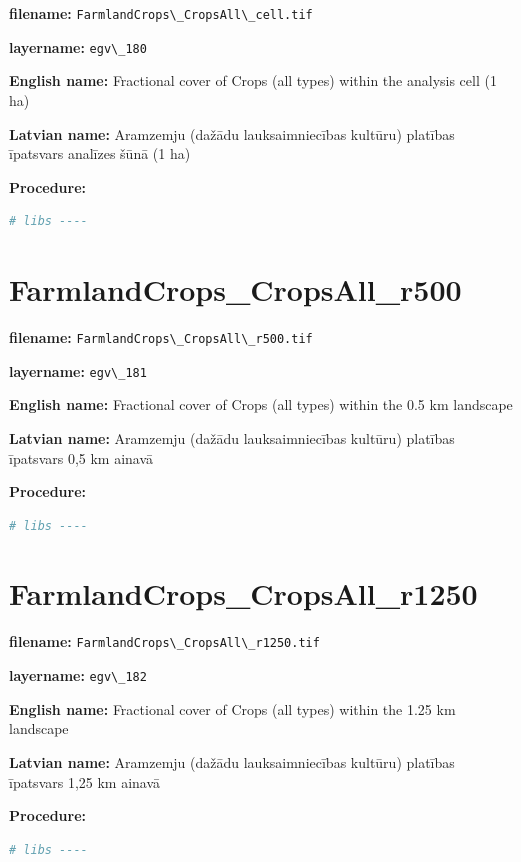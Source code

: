 \documentclass[
]{book}
\newcommand{\passthrough}[1]{#1}
\begin{document}
\textbf{filename:} \passthrough{\lstinline!FarmlandCrops\_CropsAll\_cell.tif!}

\textbf{layername:} \passthrough{\lstinline!egv\_180!}

\textbf{English name:} Fractional cover of Crops (all types) within the analysis cell (1 ha)

\textbf{Latvian name:} Aramzemju (dažādu lauksaimniecības kultūru) platības īpatsvars analīzes šūnā (1 ha)

\textbf{Procedure:}

\begin{lstlisting}[language=R]
# libs ----
\end{lstlisting}

\section{FarmlandCrops\_CropsAll\_r500}\label{ch06.181}

\textbf{filename:} \passthrough{\lstinline!FarmlandCrops\_CropsAll\_r500.tif!}

\textbf{layername:} \passthrough{\lstinline!egv\_181!}

\textbf{English name:} Fractional cover of Crops (all types) within the 0.5 km landscape

\textbf{Latvian name:} Aramzemju (dažādu lauksaimniecības kultūru) platības īpatsvars 0,5 km ainavā

\textbf{Procedure:}

\begin{lstlisting}[language=R]
# libs ----
\end{lstlisting}

\section{FarmlandCrops\_CropsAll\_r1250}\label{ch06.182}

\textbf{filename:} \passthrough{\lstinline!FarmlandCrops\_CropsAll\_r1250.tif!}

\textbf{layername:} \passthrough{\lstinline!egv\_182!}

\textbf{English name:} Fractional cover of Crops (all types) within the 1.25 km landscape

\textbf{Latvian name:} Aramzemju (dažādu lauksaimniecības kultūru) platības īpatsvars 1,25 km ainavā

\textbf{Procedure:}

\begin{lstlisting}[language=R]
# libs ----
\end{lstlisting}
\end{document}
